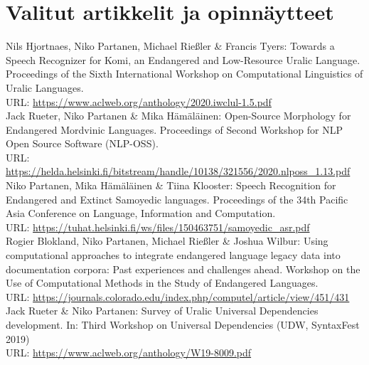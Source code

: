 \documentclass[11pt, a4paper]{article}
\newcommand{\years}[1]{\marginnote{\scriptsize #1}} %
\begin{document}
\section*{Valitut artikkelit ja opinnäytteet}


\years{2020} Nils Hjortnaes, Niko Partanen, Michael Rießler \& Francis Tyers:  Towards a Speech Recognizer for Komi, an Endangered and Low-Resource Uralic Language. Proceedings of the Sixth International Workshop on Computational Linguistics of Uralic Languages.\\
URL: \url{https://www.aclweb.org/anthology/2020.iwclul-1.5.pdf}\\

\years{2020} Jack Rueter, Niko Partanen \& Mika Hämäläinen: Open-Source Morphology for Endangered Mordvinic Languages. Proceedings of Second Workshop for NLP Open Source Software (NLP-OSS).\\
URL: \url{https://helda.helsinki.fi/bitstream/handle/10138/321556/2020.nlposs_1.13.pdf}\\

\years{2020} Niko Partanen, Mika Hämäläinen \& Tiina Klooster: Speech Recognition for Endangered and Extinct Samoyedic languages. Proceedings of the 34th Pacific Asia Conference on Language, Information and Computation. \\
URL: \url{https://tuhat.helsinki.fi/ws/files/150463751/samoyedic_asr.pdf}\\

\years{2019} Rogier Blokland, Niko Partanen, Michael Rießler \& Joshua Wilbur: Using computational approaches to integrate endangered language legacy data into documentation corpora: Past experiences and challenges ahead. Workshop on the Use of Computational Methods in the Study of Endangered Languages. \\
URL: \url{https://journals.colorado.edu/index.php/computel/article/view/451/431}\\

\years{2019} Jack Rueter \& Niko Partanen: Survey of Uralic Universal Dependencies development. In: Third Workshop on Universal Dependencies (UDW, SyntaxFest 2019)
\\URL: \url{https://www.aclweb.org/anthology/W19-8009.pdf}\\
\end{document}
